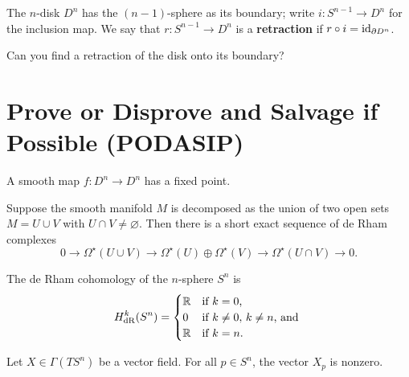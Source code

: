 \documentclass{homework}
\begin{document}
\begin{problem} The $n$-disk $D^n$ has the $(n-1)$-sphere as its
boundary; write $i : S^{n-1} \to D^n$ for the inclusion map.  We say
that $r : S^{n-1} \to D^n$ is a \textbf{retraction} if $r \circ i =
\operatorname{id}_{\partial D^n}$.

Can you find a retraction of the disk onto its boundary?
\end{problem}

\section{Prove or Disprove and Salvage if Possible (PODASIP)}

\begin{problem}
 A smooth map $f : D^n \to D^n$ has a fixed point. 
\end{problem}


\begin{problem}
  Suppose the smooth manifold $M$ is decomposed as the union of two open sets $M = U \cup V$ with $U \cap V \neq \varnothing$.  Then there is a short exact sequence of de Rham complexes
  \[
    0 \longrightarrow \Omega^\star(U \cup V) \longrightarrow \Omega^\star(U) \oplus \Omega^\star(V) \longrightarrow \Omega^\star(U \cap V) \longrightarrow 0.
 \]
\end{problem}

\begin{problem}
  The de Rham cohomology of the $n$-sphere $S^n$ is
  \[
    H_{\operatorname{dR}}^k(S^n) = \begin{cases}
      \mathbb{R} & \mbox{if $k = 0$,} \\
      0 & \mbox{if $k \neq 0, \, k \neq n$, and }\\
      \mathbb{R} & \mbox{if $k = n$.}
      \end{cases}
  \]
\end{problem}

\begin{problem}
  Let $X \in \Gamma(TS^n)$ be a vector field.  For all $p \in S^n$, the vector $X_p$ is nonzero. 
\end{problem}
\end{document}
